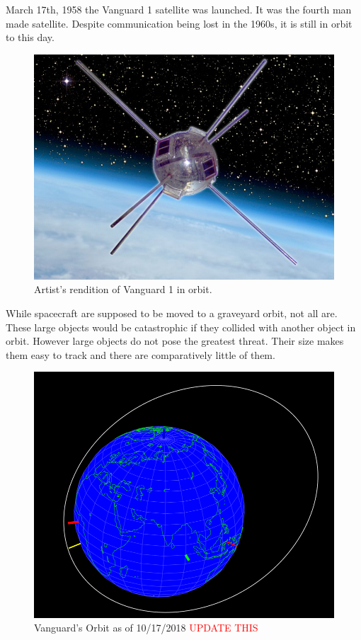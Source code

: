 \documentclass[12pt]{report}
\begin{document}
	March 17th, 1958 the Vanguard 1 satellite was launched. It was the fourth man made satellite. Despite communication being lost in the 1960s, it is still in orbit to this day\cite{usnrl_2008}. \par 
	
	\begin{figure}[h!]
		\centering
		\includegraphics[width=0.7\linewidth]{Vanguard_1_composite}
		\caption{Artist's rendition of Vanguard 1 in orbit.}
		\label{fig:vanguard1composite}
	\end{figure}
	
	While spacecraft are supposed to be moved to a graveyard orbit, not all are. These large objects would be catastrophic if they collided with another object in orbit. However large objects do not pose the greatest threat. Their size makes them easy to track and there are comparatively little of them. 
	
	\begin{figure}
		\centering
		\includegraphics[width=0.7\linewidth]{Vanguard_1_orbit}
		\caption{Vanguard's Orbit as of 10/17/2018 \textcolor{red}{UPDATE THIS}}
		\label{fig:vanguard1orbit}
	\end{figure}
\end{document}
